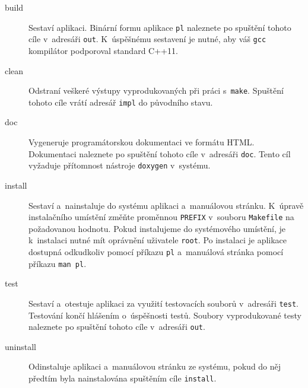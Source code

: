 \documentclass[thesis=B,czech,hidelinks]{thesis}[2012/06/26]
\begin{document}
\begin{description}
	\item[build] Sestaví aplikaci. Binární formu aplikace \texttt{pl} naleznete po spuštění tohoto cíle v~adresáři \texttt{out}. K~úspěšnému sestavení je nutné, aby váš \texttt{gcc} kompilátor podporoval standard C++11.
	\item[clean] Odstraní veškeré výstupy vyprodukovaných při práci s~\texttt{make}. Spuštění tohoto cíle vrátí adresář \texttt{impl} do původního stavu.
	\item[doc] Vygeneruje programátorskou dokumentaci ve formátu HTML. Dokumentaci naleznete po spuštění tohoto cíle v~adresáři \texttt{doc}. Tento cíl vyžaduje přítomnost nástroje \texttt{doxygen} v~systému.
	\item[install] Sestaví a~nainstaluje do systému aplikaci a~manuálovou stránku. K~úpravě instalačního umístění změňte proměnnou \texttt{PREFIX} v~souboru \texttt{Makefile} na požadovanou hodnotu. Pokud instalujeme do systémového umístění, je k~instalaci nutné mít oprávnění uživatele \texttt{root}. Po instalaci je aplikace dostupná odkudkoliv pomocí příkazu \texttt{pl} a~manuálová stránka pomocí příkazu \texttt{man pl}.
	\item[test] Sestaví a~otestuje aplikaci za využití testovacích souborů v~adresáři \texttt{test}. Testování končí hlášením o~úspěšnosti testů. Soubory vyprodukované testy naleznete po spuštění tohoto cíle v~adresáři \texttt{out}.
	\item[uninstall] Odinstaluje aplikaci a~manuálovou stránku ze systému, pokud do něj předtím byla nainstalována spuštěním cíle \texttt{install}. 
\end{description}
\end{document}
